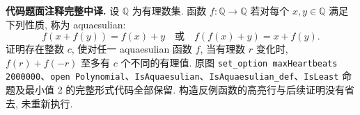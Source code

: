 \noindent\textbf{代码题面注释完整中译.} 设 $\mathbb Q$ 为有理数集. 函数 $f:\mathbb Q\to\mathbb Q$ 若对每个 $x,y\in\mathbb Q$ 满足下列性质, 称为 aquaesulian:
\[
f(x+f(y))=f(x)+y\quad\text{或}\quad f(f(x)+y)=x+f(y).
\]
证明存在整数 $c$, 使对任一 aquaesulian 函数 $f$, 当有理数 $r$ 变化时, $f(r)+f(-r)$ 至多有 $c$ 个不同的有理值. 原图 \texttt{set\_option maxHeartbeats 2000000}、\texttt{open Polynomial}、\texttt{IsAquaesulian}、\texttt{IsAquaesulian\_def}、\texttt{IsLeast} 命题及最小值 2 的完整形式代码全部保留. 构造反例函数的高亮行与后续证明没有省去, 未重新执行.


